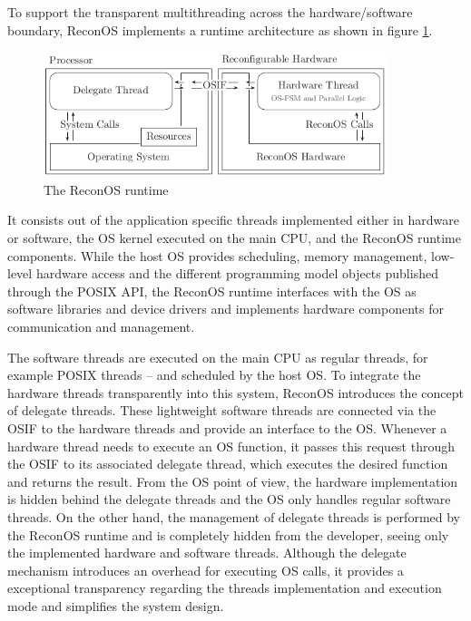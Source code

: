 To support the transparent multithreading across the hardware/software
boundary, ReconOS implements a runtime architecture as shown in figure
\ref{fig:reconos_runtime}.
\begin{figure}[tb]
	\centering
	\includegraphics[width=10cm]{../figures/reconos_hwt}
	\caption{The ReconOS runtime}
	\label{fig:reconos_runtime}
\end{figure}
It consists out of the application specific threads implemented either in
hardware or software, the \ac{OS} kernel executed on the main \ac{CPU}, and the
ReconOS runtime components. While the host \ac{OS} provides scheduling, memory
management, low-level hardware access and the different programming model
objects published through the \ac{POSIX} API, the ReconOS runtime interfaces
with the \ac{OS} as software libraries and device drivers and implements
hardware components for communication and management.

The software threads are executed on the main \ac{CPU} as regular threads, for
example \ac{POSIX} threads -- and scheduled by the host \ac{OS}. To integrate
the hardware threads transparently into this system, ReconOS introduces the
concept of delegate threads. These lightweight software threads are connected
via the \ac{OSIF} to the hardware threads and provide an interface to the
\ac{OS}. Whenever a hardware thread needs to execute an \ac{OS} function, it
passes this request through the \ac{OSIF} to its associated delegate thread,
which executes the desired function and returns the result. From the \ac{OS}
point of view, the hardware implementation is hidden behind the delegate
threads and the \ac{OS} only handles regular software threads. On the other
hand, the management of delegate threads is performed by the ReconOS runtime
and is completely hidden from the developer, seeing only the implemented
hardware and software threads. Although the delegate mechanism introduces an
overhead for executing \ac{OS} calls, it provides a exceptional transparency
regarding the threads implementation and execution mode and simplifies the
system design.

